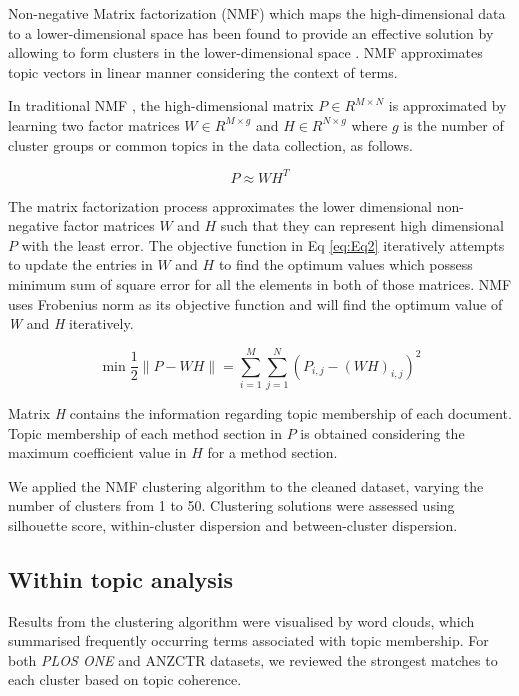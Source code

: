 \documentclass[12pt]{article}
\begin{document}
Non-negative Matrix factorization (NMF) which maps the high-dimensional
data to a lower-dimensional space has been found to provide an effective
solution by allowing to form clusters in the lower-dimensional space
\citep[\citet{luong2019clustering}]{kim2014algorithms}. NMF approximates
topic vectors in linear manner considering the context of terms.

In traditional NMF \citep{aggarwal2012mining}, the high-dimensional
matrix \(P \in R^{M \times N}\) is approximated by learning two factor
matrices \(W \in R^{M \times g}\) and \(H \in R ^{N \times g}\) where
\(g\) is the number of cluster groups or common topics in the data
collection, as follows.

\begin{equation}
\label{eq:2}
 P \approx WH^{T}
\end{equation}

The matrix factorization process approximates the lower dimensional
non-negative factor matrices \(W\) and \(H\) such that they can
represent high dimensional \(P\) with the least error. The objective
function in Eq \ref{eq:Eq2} iteratively attempts to update the entries
in \(W\) and \(H\) to find the optimum values which possess minimum sum
of square error for all the elements in both of those matrices. NMF uses
Frobenius norm as its objective function and will find the optimum value
of \textit{W} and \textit{H} iteratively.

\begin{equation}
\label{eq:Eq2}
\min \frac{1}{2}\|P - WH\|= \sum _{i=1}^{M}\sum _{j=1}^{N} \left(  P_{i,j} -\left(WH \right)_{i,j} \right)^{2}
\end{equation}

Matrix \textit{H} contains the information regarding topic membership of
each document. Topic membership of each method section in \(P\) is
obtained considering the maximum coefficient value in \(H\) for a method
section.

We applied the NMF clustering algorithm to the cleaned dataset, varying
the number of clusters from 1 to 50. Clustering solutions were assessed
using silhouette score, within-cluster dispersion and between-cluster
dispersion.

\subsection{Within topic analysis}

Results from the clustering algorithm were visualised by word clouds,
which summarised frequently occurring terms associated with topic
membership. For both \emph{PLOS ONE} and ANZCTR datasets, we reviewed
the strongest matches to each cluster based on topic coherence.
\end{document}
